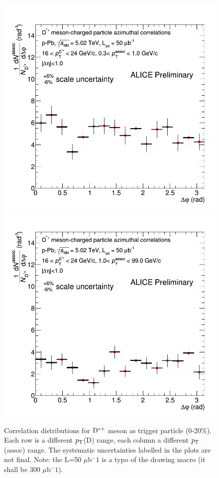 \begin{figure}
{\includegraphics[width=0.32\linewidth]{figuresVsCent/Dstar/Correlations/020/CanvaAndVariedHistopPbDstarPt16to24assocPt03to1.png}}
{\includegraphics[width=0.32\linewidth]{figuresVsCent/Dstar/Correlations/020/CanvaAndVariedHistopPbDstarPt16to24assocPt1to99.png}}
 \caption{Correlation distributions for ${\rm D^{*+}}$ meson as trigger particle (0-20\%). Each row is a different $p_{\rm T}$(D) range, each column a different $p_{\rm T}$(assoc) range. The systematic uncertainties labelled in the plots are not final. Note: the L=50 $\mu$b$^-1$ is a typo of the drawing macro (it shall be 300 $\mu$b$^-1$).}
\label{fig:Dstarcorr020}
\end{figure}

